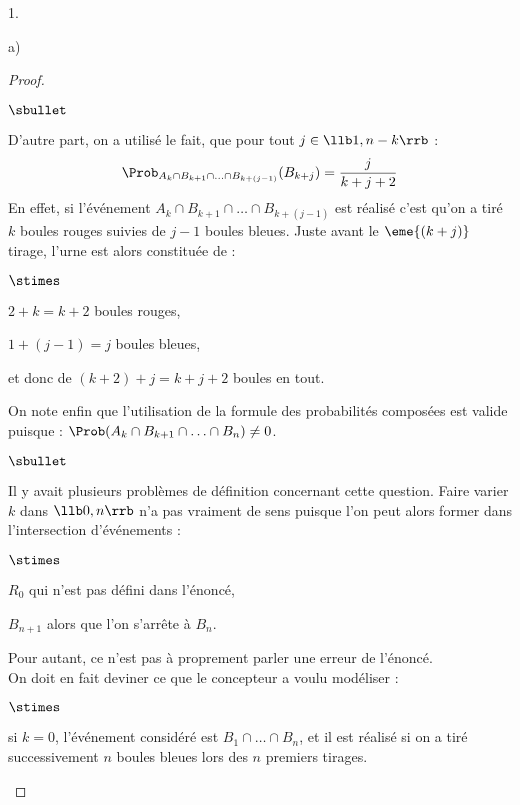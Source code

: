 \begin{noliste}{1.}
\begin{noliste}{a)}
\begin{proof}
\begin{noliste}{$\sbullet$}
      \item D'autre part, on a utilisé le fait, que pour tout $j \in
        \llb 1, n-k \rrb$ :
        \[
        \Prob_{A_k \cap B_{k+1} \cap \ldots \cap B_{k+(j-1)}}(B_{k+j})
        = \dfrac{j}{k+j+2}
        \]
        En effet, si l'événement $A_k \cap B_{k+1} \cap \ldots \cap
        B_{k+(j-1)}$ est réalisé c'est qu'on a tiré $k$
        boules rouges suivies de $j-1$ boules bleues. Juste avant le
        $\eme{(k+j)}$ tirage, l'urne est alors constituée de :
        \begin{noliste}{$\stimes$}
        \item $2 + k = k+2$ boules rouges,
        \item $1 + (j-1) = j$ boules bleues,
        \item et donc de $(k+2) + j = k + j + 2$ boules en tout.
        \end{noliste}

      \item On note enfin que l'utilisation de la formule des
        probabilités composées est valide puisque : $\Prob(A_k \cap
        B_{k+1} \cap \ldots \cap B_{n}) \neq 0$.
      \end{noliste}
      \begin{remark}
        \begin{noliste}{$\sbullet$}
        \item Il y avait plusieurs problèmes de définition concernant
          cette question. Faire varier $k$ dans $\llb 0,n \rrb$ n'a
          pas vraiment de sens puisque l'on peut alors former dans
          l'intersection d'événements :
          \begin{noliste}{$\stimes$}
          \item $R_0$ qui n'est pas défini dans l'énoncé,
          \item $B_{n+1}$ alors que l'on s'arrête à $B_n$.
          \end{noliste}

        \item Pour autant, ce n'est pas à proprement parler une erreur
          de l'énoncé.\\
          On doit en fait deviner ce que le concepteur a voulu
          modéliser :
          \begin{noliste}{$\stimes$}
          \item si $k = 0$, l'événement considéré est $B_1 \cap \ldots
            \cap B_n$, et il est réalisé si on a tiré successivement
            $n$ boules bleues lors des $n$ premiers tirages.


\end{noliste}
\end{noliste}
\end{remark}
\end{proof}
\end{noliste}
\end{noliste}
